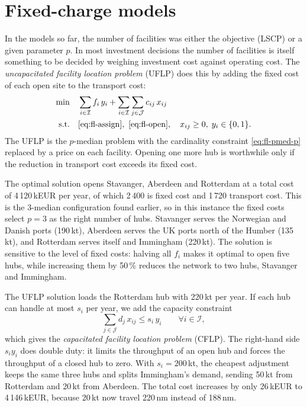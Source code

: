 \section{Fixed-charge models}
\label{sec:fl-fixed}

In the models so far, the number of facilities was either the objective (LSCP) or a given parameter $p$. In most investment decisions the number of facilities is itself something to be decided by weighing investment cost against operating cost. The \emph{uncapacitated facility location problem} (UFLP) does this by adding the fixed cost of each open site to the transport cost:
\begin{align}
  \min\quad & \sum_{i\in\mathcal{I}} f_i\, y_i + \sum_{i\in\mathcal{I}}\sum_{j\in\mathcal{J}} c_{ij}\, x_{ij} \label{eq:fl-uflp-obj}\\
  \text{s.t.}\quad & \eqref{eq:fl-assign},\ \eqref{eq:fl-open}, \quad x_{ij}\ge 0,\; y_i\in\{0,1\}. \nonumber
\end{align}
The UFLP is the $p$-median problem with the cardinality constraint \eqref{eq:fl-pmed-p} replaced by a price on each facility. Opening one more hub is worthwhile only if the reduction in transport cost exceeds its fixed cost.

The optimal solution opens Stavanger, Aberdeen and Rotterdam at a total cost of 4\,120\,kEUR per year, of which 2\,400 is fixed cost and 1\,720 transport cost. This is the 3-median configuration found earlier, so in this instance the fixed costs select $p=3$ as the right number of hubs. Stavanger serves the Norwegian and Danish ports (190\,kt), Aberdeen serves the UK ports north of the Humber (135\,kt), and Rotterdam serves itself and Immingham (220\,kt). The solution is sensitive to the level of fixed costs: halving all $f_i$ makes it optimal to open five hubs, while increasing them by 50\,\% reduces the network to two hubs, Stavanger and Immingham.

The UFLP solution loads the Rotterdam hub with 220\,kt per year. If each hub can handle at most $s_i$ per year, we add the capacity constraint
\begin{equation}
  \sum_{j\in\mathcal{J}} d_j\, x_{ij} \le s_i\, y_i \qquad \forall i\in\mathcal{I},
  \label{eq:fl-cap}
\end{equation}
which gives the \emph{capacitated facility location problem} (CFLP). The right-hand side $s_i y_i$ does double duty: it limits the throughput of an open hub and forces the throughput of a closed hub to zero. With $s_i=200$\,kt, the cheapest adjustment keeps the same three hubs and splits Immingham's demand, sending 50\,kt from Rotterdam and 20\,kt from Aberdeen. The total cost increases by only 26\,kEUR to 4\,146\,kEUR, because 20\,kt now travel 220\,nm instead of 188\,nm.

